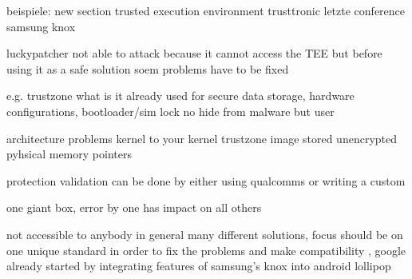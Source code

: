 beispiele:
new section trusted execution environment
trusttronic letzte conference
samsung knox


luckypatcher not able to attack because it cannot access the TEE but before using it as a safe solution soem problems have to be fixed

%
e.g. trustzone
what is it already used for
secure data storage, hardware configurations, bootloader/sim lock
no hide from malware but user

architecture problems
kernel to your kernel
trustzone image stored unencrypted
pyhsical memory pointers

protection
validation can be done by either using qualcomms or writing a custom

one giant box, error by one has impact on all others

\cite{dragonTZ}\cite{armTz}
%

not accessible to anybody
in general many different solutions, focus should be on one unique standard in order to fix the problems and make compatibility , google already started by integrating features of samsung's knox into android lollipop \cite{samsungKnox}
